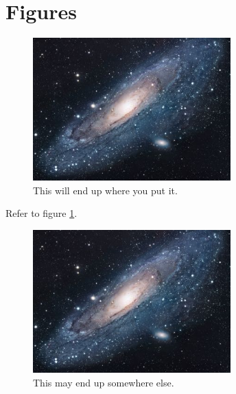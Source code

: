 \section{Figures}

\begin{figure}[H]
  \centering
  \includegraphics[width=3in]{figs/universe}
  \caption{This will end up where you put it.}\label{f:universe1}
\end{figure}

Refer to figure \ref{f:universe1}. 

\begin{figure}
  \centering
  \includegraphics[width=3in]{figs/universe}
  \caption{This may end up somewhere else.}\label{f:universe2}
\end{figure}


